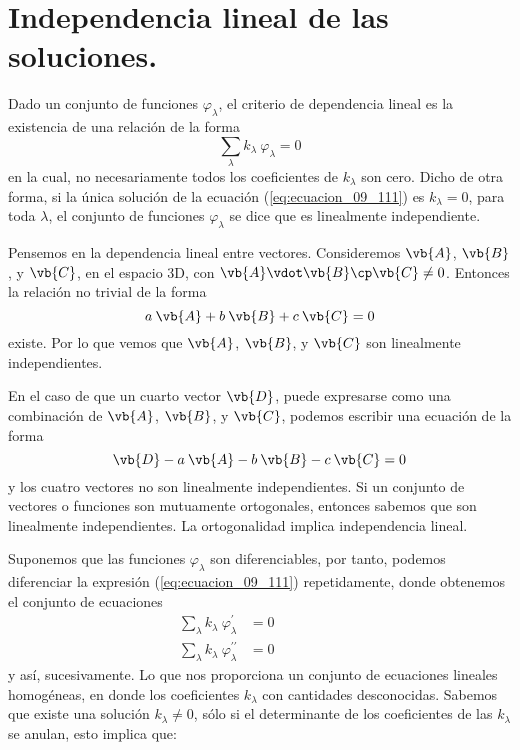 \section{Independencia lineal de las soluciones.}
Dado un conjunto de funciones $\varphi_{\lambda}$, el criterio de dependencia lineal es la existencia de una relación de la forma
\begin{equation}
\sum_{\lambda} k_{\lambda} \: \varphi_{\lambda} = 0 
\label{eq:ecuacion_09_111}
\end{equation}
en la cual, no necesariamente todos los coeficientes de $k_{\lambda}$ son cero. Dicho de otra forma, si la única solución de la ecuación (\ref{eq:ecuacion_09_111}) es $k_{\lambda} = 0$, para toda $\lambda$, el conjunto de funciones $\varphi_{\lambda}$ se dice que es linealmente independiente.
\par
Pensemos en la dependencia lineal entre vectores. Consideremos $\vb{A}$, $\vb{B}$, y $\vb{C}$, en el espacio 3D, con $\vb{A} \vdot \vb{B} \cp \vb{C} \neq 0$. Entonces la relación no trivial de la forma
\begin{equation}
a \: \vb{A} + b \: \vb{B} + c \: \vb{C} = 0
\label{eq:ecuacion_09_112}
\end{equation}
existe. Por lo que vemos que $\vb{A}$, $\vb{B}$, y $\vb{C}$ son linealmente independientes.
\par
En el caso de que un cuarto vector $\vb{D}$, puede expresarse como una combinación de $\vb{A}$, $\vb{B}$, y $\vb{C}$, podemos escribir una ecuación de la forma
\begin{equation}
\vb{D} -  a \: \vb{A} - b \: \vb{B} - c \: \vb{C} = 0
\label{eq:ecuacion_09_113}
\end{equation}
y los cuatro vectores no son linealmente independientes. Si un conjunto de vectores o funciones son mutuamente ortogonales, entonces sabemos que son linealmente independientes. La ortogonalidad implica independencia lineal.
\par
Suponemos que las funciones $\varphi_{\lambda}$ son diferenciables, por tanto, podemos diferenciar la expresión (\ref{eq:ecuacion_09_111}) repetidamente, donde obtenemos el conjunto de ecuaciones
\begin{align}
\sum_{\lambda} k_{\lambda} \: \varphi^{\prime}_{\lambda} &= 0 \label{eq:ecuacion_09_114} \\
\sum_{\lambda} k_{\lambda} \: \varphi^{\prime \prime}_{\lambda} &= 0 \hspace{2cm} \label{eq:ecuacion_09_115}
\end{align}
y así, sucesivamente. Lo que nos proporciona un conjunto de ecuaciones lineales homogéneas, en donde los coeficientes $k_{\lambda}$ con cantidades desconocidas. Sabemos que existe una solución $k_{\lambda} \neq 0$, sólo si el determinante de los coeficientes de las $k_{\lambda}$ se anulan, esto implica que:
